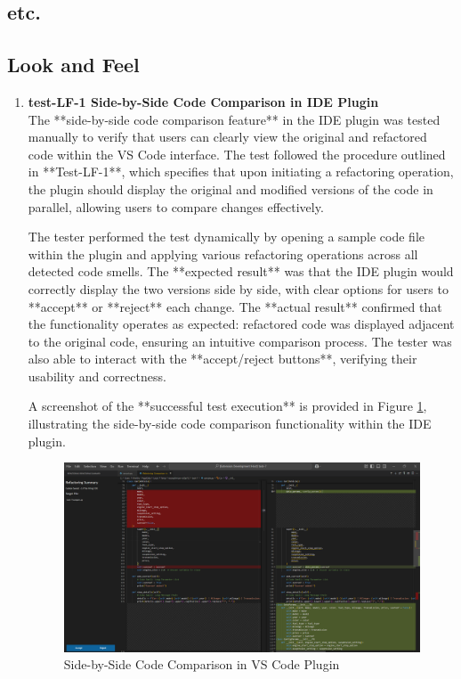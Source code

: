 \documentclass[12pt, titlepage]{article}
\begin{document}
\subsection{etc.}

\subsection{Look and Feel}
\begin{enumerate}
\item \textbf{test-LF-1 Side-by-Side Code Comparison in IDE Plugin} \\[2mm]
The **side-by-side code comparison feature** in the IDE plugin was tested manually to verify that users can clearly view the original and refactored code within the VS Code interface. The test followed the procedure outlined in **Test-LF-1**, which specifies that upon initiating a refactoring operation, the plugin should display the original and modified versions of the code in parallel, allowing users to compare changes effectively.

The tester performed the test dynamically by opening a sample code file within the plugin and applying various refactoring operations across all detected code smells. The **expected result** was that the IDE plugin would correctly display the two versions side by side, with clear options for users to **accept** or **reject** each change. The **actual result** confirmed that the functionality operates as expected: refactored code was displayed adjacent to the original code, ensuring an intuitive comparison process. The tester was also able to interact with the **accept/reject buttons**, verifying their usability and correctness.

A screenshot of the **successful test execution** is provided in Figure \ref{fig:lf1_test}, illustrating the side-by-side code comparison functionality within the IDE plugin.

\FloatBarrier
\begin{figure}[h]
    \centering
    \includegraphics[width=0.8\linewidth]{../Images/test-LF-1-image.png}
    \caption{Side-by-Side Code Comparison in VS Code Plugin}
    \label{fig:lf1_test}
\end{figure}
\FloatBarrier 


\end{enumerate}
\end{document}
